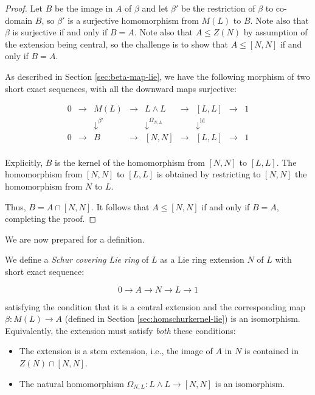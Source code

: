 \documentclass{ucetd}
\begin{document}
\begin{proof}
  Let $B$ be the image in $A$ of $\beta$ and let $\beta'$ be the
  restriction of $\beta$ to co-domain $B$, so $\beta'$ is a surjective
  homomorphism from $M(L)$ to $B$. Note also that $\beta$ is
  surjective if and only if $B = A$. Note also that $A \le Z(N)$ by
  assumption of the extension being central, so the challenge is to
  show that $A \le [N,N]$ if and only if $B = A$.

  As described in Section \ref{sec:beta-map-lie}, we have the following
  morphism of two short exact sequences, with all the downward maps
  surjective:

  $$\begin{array}{ccccccccc}
    0 & \to & M(L) & \to & L \wedge L & \to & [L,L] & \to & 1\\
    &&   \downarrow^{\beta'}  &&  \downarrow^{\Omega_{N,L}}     && \downarrow^{\text{id}} && \\
    0 & \to & B &\to & [N,N] & \to & [L,L] & \to & 1\\
  \end{array}$$

  Explicitly, $B$ is the kernel of the homomorphism from $[N,N]$ to
  $[L,L]$. The homomorphism from $[N,N]$ to $[L,L]$ is obtained by
  restricting to $[N,N]$ the homomorphism from $N$ to $L$. 

  Thus, $B = A \cap [N,N]$. It follows that $A \le [N,N]$ if and only
  if $B = A$, completing the proof.
\end{proof}

We are now prepared for a definition.

\begin{definer}
  We define a {\em Schur covering Lie ring} of $L$ as a Lie ring
  extension $N$ of $L$ with short exact sequence:

  $$0 \to A \to N \to L \to 1$$
  
  satisfying the condition that it is a central extension and the
  corresponding map $\beta: M(L) \to A$ (defined in Section
  \ref{sec:homschurkernel-lie}) is an isomorphism. Equivalently, the
  extension must satisfy {\em both} these conditions:
  
  \begin{itemize}
  \item The extension is a stem extension, i.e., the image of $A$ in $N$
    is contained in $Z(N) \cap [N,N]$.
  \item The natural homomorphism $\Omega_{N,L}: L \wedge L \to [N,N]$ is an
    isomorphism.
  \end{itemize}
\end{definer}
  
\end{document}
